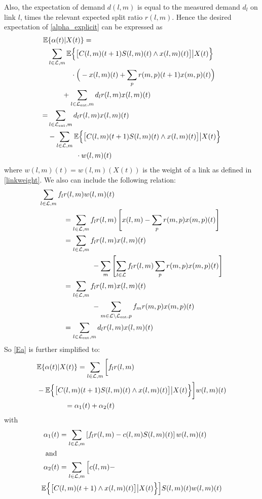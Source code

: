 \vspace{0.5cm}

Also, the expectation of demand $d(l,m)$ is equal to the measured demand $d_{l}$ on link $l$, times the relevant expected split ratio $r(l,m)$. 
Hence the desired expectation of \eqref{alpha_explicit} can be expressed as
\begin{align} 
\nonumber \mathbb{E} & \{\alpha (t) | X(t)\}= \\
\nonumber & \sum_{l \in \linkset,m} \expectation{ \big[C(l,m)(t+1)S(l,m)(t)\wedge x(l,m)(t)\big]\big| X(t)}\\
\nonumber & \qquad \quad  \;   \cdot \Big(-x(l,m)(t) + \sum_{p}r(m,p)(t+1)x(m,p)(t)\Big) \\
 \nonumber &\qquad + \sum_{l \in \entrylinks,m} d_l r(l,m) x(l,m)(t)  \\
 \nonumber =& \sum_{l \in \entrylinks,m} d_l r(l,m) x(l,m)(t) \\
\nonumber &- \sum_{l \in \linkset,m} \expectation{ \big[C(l,m)(t+1)S(l,m)(t)\wedge x(l,m)(t)\big] \big| X(t)} \\  
\label{Ea} &\qquad \qquad \cdot w(l,m)(t)
\end{align}
where $w(l,m)(t) = w(l,m)(X(t))$ is the weight of a link as defined in \eqref{linkweight}. 
We also can include the following relation: 
\begin{align*}
\sum_{l \in \mathcal{L},m} f_l &r(l,m) w(l,m)(t) \\ 
& = \sum_{l \in \mathcal{L},m} f_l r(l,m) \left[ x(l,m) - \sum_p r(m,p)x(m,p)(t) \right] \\
& = \sum_{l \in \mathcal{L},m} f_l r(l,m)x(l,m)(t) \\
&\qquad \qquad - \sum_m  \left[ \sum_{l\in\mathcal{L}} f_l r(l,m) \sum_p r(m,p)x(m,p)(t) \right] \\
& = \sum_{l \in \mathcal{L},m} f_l r(l,m)x(l,m)(t)\\
&\qquad \qquad  - \sum_{m\in \mathcal{L} \backslash \mathcal{L}_{\text{ent}}, p}   f_m r(m,p)x(m,p)(t) \\ 
& =  \sum_{l \in \mathcal{L}_{\text{ent}},m} d_l r(l,m)x(l,m)(t)
\end{align*}
So \eqref{Ea} is further simplified to: 
\begin{align} \label{expected_short}
 & \mathbb{E}\{\alpha (t) | X(t)\} = \sum_{l \in \linkset,m} \bigg[ f_l r(l,m)  \\
 \nonumber  & - \expectation{ \big[C(l,m)(t+1)S(l,m)(t)\wedge x(l,m)(t)\big] \big| X(t)}  \bigg] w(l,m)(t)  \\  
 & \qquad \qquad = \alpha_1 (t) + \alpha_2 (t) \nonumber
\end{align}
with 
\begin{align} \label{a1_def}
\alpha_1 (t) &=  \sum_{l \in \linkset,m} \left[ f_l r(l,m) - c(l,m)S(l,m)(t) \right] w(l,m)(t)   \\
\nonumber \text{ and }&  \\ 
 \alpha_2 (t) & =  \sum_{l \in \linkset,m} \Big[ c(l,m)- \\ \nonumber
\expectation{ \big[C & (l,m)(t+1)\wedge x(l,m)(t)\big] \big| X(t) }  \Big] S(l,m)(t)w(l,m)(t)  
\end{align}


